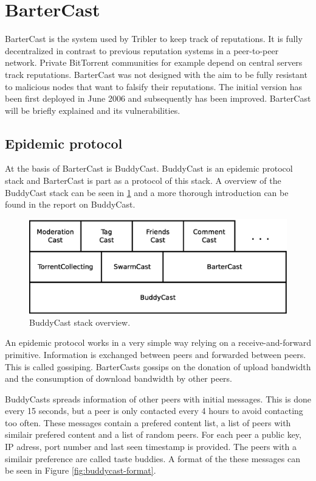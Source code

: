 \section{BarterCast}
BarterCast is the system used by Tribler to keep track of reputations\cite{pouwelse-buddycast}\cite{meulpolder-bartercast}\cite{meulpolder-bartercast-paper}\cite{dumitrescu-tribler}.
It is fully decentralized in contrast to previous reputation systems in a peer-to-peer network.
Private BitTorrent communities for example depend on central servers track reputations.
BarterCast was not designed with the aim to be fully resistant to malicious nodes
that want to falsify their reputations.
The initial version has been first deployed in June 2006
and subsequently has been improved.
BarterCast will be briefly explained and its vulnerabilities.

\subsection{Epidemic protocol}
At the basis of BarterCast is BuddyCast.
BuddyCast is an epidemic protocol stack and BarterCast is part as a protocol of this stack.
A overview of the BuddyCast stack can be seen in \ref{fig:buddycast-stack}
and a more thorough introduction can be found in the report on BuddyCast\cite{pouwelse-buddycast}.

\begin{figure}
	\centerline{\includegraphics[scale=0.3]{relatedWork/figs/buddycast-stack.eps}}
	\caption{BuddyCast stack overview\cite{pouwelse-buddycast}.}
	\label{fig:buddycast-stack}
\end{figure}

An epidemic protocol works in a very simple way relying on a receive-and-forward primitive.
Information is exchanged between peers and forwarded between peers.
This is called gossiping.
BarterCasts gossips on the donation of upload bandwidth
and the consumption of download bandwidth by other peers.

BuddyCasts spreads information of other peers with initial messages.
This is done every 15 seconds, but a peer is only contacted every 4 hours to avoid contacting too often.
These messages contain a prefered content list, a list of peers with similair prefered content
and a list of random peers.
For each peer a public key, IP adress, port number and last seen timestamp is provided.
The peers with a similair preference are called taste buddies.
A format of the these messages can be seen in Figure \ref{fig:buddycast-format}.

